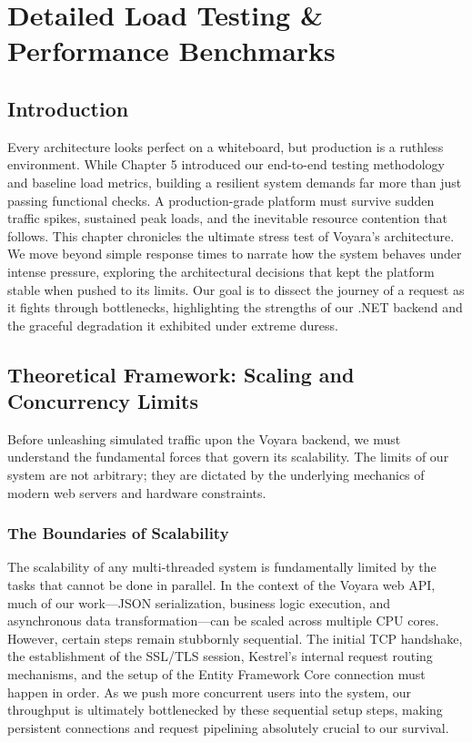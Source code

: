 \chapter{Detailed Load Testing \& Performance Benchmarks}

\section{Introduction}
Every architecture looks perfect on a whiteboard, but production is a ruthless environment. While Chapter 5 introduced our end-to-end testing methodology and baseline load metrics, building a resilient system demands far more than just passing functional checks. A production-grade platform must survive sudden traffic spikes, sustained peak loads, and the inevitable resource contention that follows. This chapter chronicles the ultimate stress test of Voyara's architecture. We move beyond simple response times to narrate how the system behaves under intense pressure, exploring the architectural decisions that kept the platform stable when pushed to its limits. Our goal is to dissect the journey of a request as it fights through bottlenecks, highlighting the strengths of our .NET backend and the graceful degradation it exhibited under extreme duress.

\section{Theoretical Framework: Scaling and Concurrency Limits}
Before unleashing simulated traffic upon the Voyara backend, we must understand the fundamental forces that govern its scalability. The limits of our system are not arbitrary; they are dictated by the underlying mechanics of modern web servers and hardware constraints.

\subsection{The Boundaries of Scalability}
The scalability of any multi-threaded system is fundamentally limited by the tasks that cannot be done in parallel. In the context of the Voyara web API, much of our work—JSON serialization, business logic execution, and asynchronous data transformation—can be scaled across multiple CPU cores. However, certain steps remain stubbornly sequential. The initial TCP handshake, the establishment of the SSL/TLS session, Kestrel's \cite{kestrel} internal request routing mechanisms, and the setup of the Entity Framework Core \cite{ef_core} connection must happen in order. As we push more concurrent users into the system, our throughput is ultimately bottlenecked by these sequential setup steps, making persistent connections and request pipelining absolutely crucial to our survival.

